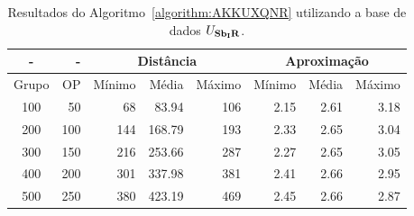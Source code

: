 \begin{table}[!htb]
  \caption{Resultados do Algoritmo~\ref{algorithm:AKKUXQNR} utilizando a base de dados $U_{\textbf{Sb\textsubscript{I}R}}{}$.}
  \label{table:PSYFOCXO}
  \centering
  \begin{tabular}{|c|r|r|r|r|r|r|r|}
    \hline
      -      &  -   & \multicolumn{3}{c|}{Distância}             & \multicolumn{3}{c|}{Aproximação}           \\ \hline
    Grupo    & OP   & Mínimo       & Média        & Máximo       & Mínimo       & Média        & Máximo       \\ \hline  
    100      & 50   & 68           & 83.94        & 106          & 2.15         & 2.61         & 3.18         \\ \hline
    200      & 100  & 144          & 168.79       & 193          & 2.33         & 2.65         & 3.04         \\ \hline
    300      & 150  & 216          & 253.66       & 287          & 2.27         & 2.65         & 3.05         \\ \hline
    400      & 200  & 301          & 337.98       & 381          & 2.41         & 2.66         & 2.95         \\ \hline
    500      & 250  & 380          & 423.19       & 469          & 2.45         & 2.66         & 2.87         \\ \hline    
  \end{tabular}
\end{table}